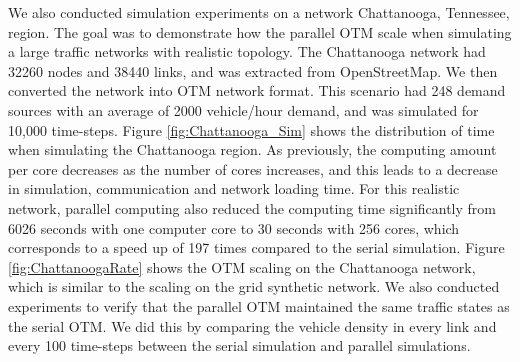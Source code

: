 We also conducted simulation experiments on a network Chattanooga, Tennessee, region. The goal was to demonstrate how the parallel OTM scale when simulating a large traffic networks with realistic topology. The Chattanooga network had 32260 nodes and 38440 links, and was extracted from OpenStreetMap\cite{haklay2008openstreetmap}. We then converted the network into OTM network format. This scenario had 248 demand sources with an average of 2000 vehicle/hour demand, and was simulated for 10,000 time-steps. 
Figure \ref{fig:Chattanooga_Sim} shows the distribution of time when simulating the Chattanooga region. As previously, the computing amount per core decreases as the number of cores increases, and this leads to a decrease in simulation, communication and network loading time. For this realistic network, parallel computing also reduced the computing time significantly from 6026 seconds with one computer core to 30 seconds with 256 cores, which corresponds to a speed up of 197 times compared to the serial simulation. Figure \ref{fig:ChattanoogaRate} shows the OTM scaling on the Chattanooga network, which is similar to the scaling on the grid synthetic network. 
We also conducted experiments to verify that the parallel OTM maintained the same traffic states as the serial OTM. We did this by comparing the vehicle density in every link and every 100 time-steps between the serial simulation and parallel simulations. 


\vspace{1in}








 








